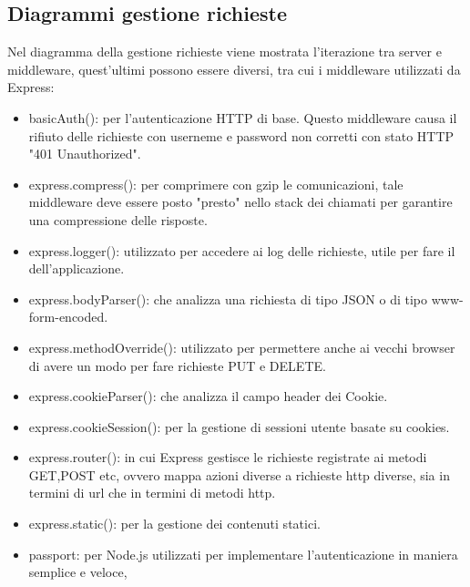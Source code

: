 \subsection{Diagrammi gestione richieste}
Nel diagramma della gestione richieste viene mostrata l'iterazione tra server e middleware, quest'ultimi possono essere diversi, tra cui i middleware utilizzati da Express:
\begin{itemize}
\item{basicAuth()}:  per l'autenticazione HTTP di base. Questo middleware causa il rifiuto delle richieste con userneme e password non corretti con stato HTTP "401 Unauthorized".
\item{express.compress()}:  per comprimere  con gzip le comunicazioni, tale middleware deve essere posto "presto" nello stack dei  chiamati per garantire una compressione delle risposte.
\item{express.logger()}:  utilizzato per accedere ai log delle richieste, utile per fare il
 dell'applicazione.
\item{express.bodyParser()}:  che analizza una richiesta di tipo JSON o di tipo www-form-encoded.
\item{express.methodOverride()}:  utilizzato per permettere anche ai vecchi browser di avere un modo per fare richieste PUT e DELETE.
\item{express.cookieParser()}:  che analizza il campo header dei Cookie.
\item{express.cookieSession()}:  per la gestione di sessioni utente basate su cookies.
\item{express.router()}:  in cui Express gestisce le richieste registrate ai metodi GET,POST etc, ovvero mappa azioni diverse a richieste http diverse, sia in termini di url che in termini di metodi http.
\item{express.static()}:  per la gestione dei contenuti statici.
\item{passport}:  per Node.js utilizzati per implementare l'autenticazione in maniera semplice e veloce,

\end{itemize}
